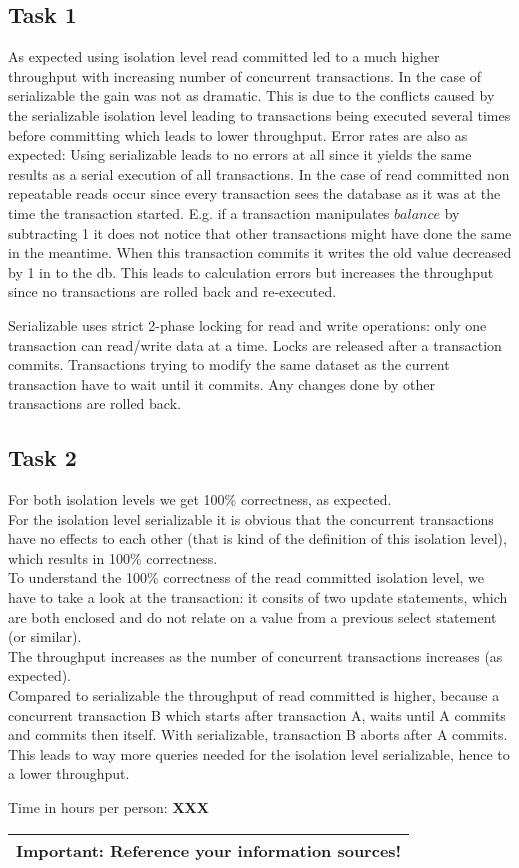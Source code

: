 \documentclass[11pt]{scrartcl}
\begin{document}
\subsection*{Task 1}
As expected using isolation level read committed led to a much higher throughput with increasing number of concurrent transactions. In the case of serializable the gain was not as dramatic. This is due to the conflicts caused by the serializable isolation level leading to transactions being executed several times before committing which leads to lower throughput.
Error rates are also as expected: Using serializable leads to no errors at all since it yields the same results as a serial execution of all transactions. In the case of read committed non repeatable reads occur since every transaction sees the database as it was at the time the transaction started. E.g. if a transaction manipulates $balance$ by subtracting 1 it does not notice that other transactions might have done the same in the meantime. When this transaction commits it writes the old value decreased by 1 in to the db. This leads to calculation errors but increases the throughput since no transactions are rolled back and re-executed.

Serializable uses strict 2-phase locking for read and write operations: only one transaction can read/write data at a time. Locks are released after a transaction commits. Transactions trying to modify the same dataset as the current transaction have to wait until it commits. Any changes done by other transactions are rolled back.

\subsection*{Task 2}

For both isolation levels we get 100\% correctness, as expected.\\
For the isolation level serializable it is obvious that the concurrent transactions have no effects to each other (that is kind of the definition of this isolation level), which results in 100\% correctness.\\
To understand the 100\% correctness of the read committed isolation level, we have to take a look at the transaction: it consits of two update statements, which are both enclosed and do not relate on a value from a previous select statement (or similar).\\
The throughput increases as the number of concurrent transactions increases (as expected).\\
Compared to serializable the throughput of read committed is higher, because a concurrent transaction B which starts after transaction A, waits until A commits and commits then itself. With serializable, transaction B aborts after A commits. This leads to way more queries needed for the isolation level serializable, hence to a lower throughput.


\bigskip

\noindent Time in hours per person: {\bf XXX}

\bigskip

\begin{center}
  \begin{tabular}{c}
    \hline
    {\bf Important:} Reference your information sources!
    \\\hline
  \end{tabular}
\end{center}
\end{document}
